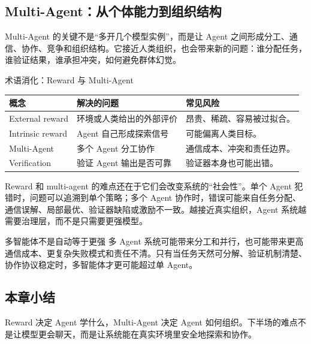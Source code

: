 \subsection{Multi-Agent：从个体能力到组织结构}

Multi-Agent 的关键不是“多开几个模型实例”，而是让 Agent 之间形成分工、通信、协作、竞争和组织结构。它接近人类组织，也会带来新的问题：谁分配任务，谁验证结果，谁承担冲突，如何避免群体幻觉。

\begin{knowledgebox}{术语消化：Reward 与 Multi-Agent}
\begin{tabularx}{\textwidth}{p{}p{}X}
\toprule
概念 & 解决的问题 & 常见风险 \\
\midrule
External reward & 环境或人类给出的外部评价 & 昂贵、稀疏、容易被过拟合。 \\
Intrinsic reward & Agent 自己形成探索信号 & 可能偏离人类目标。 \\
Multi-Agent & 多个 Agent 分工协作 & 通信成本、冲突和责任边界。 \\
Verification & 验证 Agent 输出是否可靠 & 验证器本身也可能出错。 \\
\bottomrule
\end{tabularx}
\end{knowledgebox}

Reward 和 multi-agent 的难点还在于它们会改变系统的“社会性”。单个 Agent 犯错时，问题可以追溯到单个策略；多个 Agent 协作时，错误可能来自任务分配、通信误解、局部最优、验证器缺陷或激励不一致。越接近真实组织，Agent 系统越需要治理层，而不是只需要更强模型。

\begin{warningbox}{多智能体不是自动等于更强}
多 Agent 系统可能带来分工和并行，也可能带来更高通信成本、更复杂失败模式和责任不清。只有当任务天然可分解、验证机制清楚、协作协议稳定时，多智能体才更可能超过单 Agent。
\end{warningbox}

\subsection{本章小结}

Reward 决定 Agent 学什么，Multi-Agent 决定 Agent 如何组织。下半场的难点不是让模型更会聊天，而是让系统能在真实环境里安全地探索和协作。


